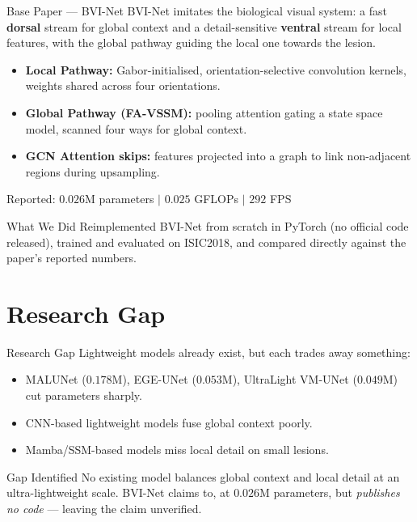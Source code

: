 \documentclass[11pt]{beamer}
\begin{document}
\begin{frame}{Base Paper --- BVI-Net}
    BVI-Net imitates the biological visual system: a fast \textbf{dorsal}
    stream for global context and a detail-sensitive \textbf{ventral} stream
    for local features, with the global pathway guiding the local one
    towards the lesion.

    \medskip

    \begin{itemize}
        \item \textbf{Local Pathway:} Gabor-initialised, orientation-selective
              convolution kernels, weights shared across four orientations.
        \item \textbf{Global Pathway (FA-VSSM):} pooling attention gating a
              state space model, scanned four ways for global context.
        \item \textbf{GCN Attention skips:} features projected into a graph
              to link non-adjacent regions during upsampling.
    \end{itemize}

    \medskip
    \alert{Reported: $0.026$M parameters $\mid$ $0.025$ GFLOPs $\mid$ $292$ FPS}

    \bigskip

    \begin{block}{What We Did}
    Reimplemented BVI-Net from scratch in PyTorch (no official code released),
    trained and evaluated on ISIC2018, and compared directly against the
    paper's reported numbers.
    \end{block}
\end{frame}


\section{Research Gap}

\begin{frame}{Research Gap}
    Lightweight models already exist, but each trades away something:

    \medskip

    \begin{itemize}
        \item MALUNet ($0.178$M), EGE-UNet ($0.053$M), UltraLight VM-UNet
              ($0.049$M) cut parameters sharply.
        \item CNN-based lightweight models fuse global context poorly.
        \item Mamba/SSM-based models miss local detail on small lesions.
    \end{itemize}

    \medskip

    \begin{block}{Gap Identified}
    No existing model balances global context and local detail at an
    ultra-lightweight scale. BVI-Net claims to, at $0.026$M parameters, but
    \emph{publishes no code} --- leaving the claim unverified.
    \end{block}
\end{frame}
\end{document}
